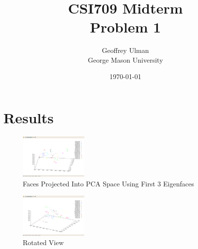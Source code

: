 \documentclass[12pt]{article}
\begin{document}
\title{CSI709 Midterm \\
Problem 1}
\author{
        Geoffrey Ulman \\
        George Mason University\\
}
\date{\today}

\maketitle

\section{Results}

\begin{figure}
\centering
\includegraphics[width=0.30\textwidth]{pca-screen-1.png}
\caption{Faces Projected Into PCA Space Using First 3 Eigenfaces}
\label{pca1}
\end{figure}

\begin{figure}
\centering
\includegraphics[width=0.30\textwidth]{pca-screen-2.png}
\caption{Rotated View}
\label{pca1}
\end{figure}
\end{document}
